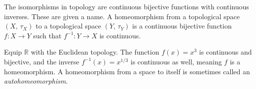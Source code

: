 \documentclass{article}
\theoremstyle{plain}
\theoremstyle{normal}
\newenvironment{example}{%
    \pushQED{\qed}\renewcommand{\qedsymbol}{$\blacksquare$}\examplex%
}{%
    \popQED\endexamplex%
}
\newenvironment{definition}{%
    \pushQED{\qed}\renewcommand{\qedsymbol}{$\blacksquare$}\definitionx%
}{%
    \popQED\enddefinitionx%
}
\begin{document}
            The isomorphisms in topology%
            are continuous bijective functions
            with continuous inverses. These are given a name.
            \begin{definition}[Homeomorphism]
                A homeomorphism from a topological space $(X,\,\tau_{X})$ to a
                topological space $(Y,\,\tau_{Y})$ is a continuous bijective
                function $f:X\rightarrow{Y}$ such that
                $f^{-1}:Y\rightarrow{X}$ is continuous.%
            \end{definition}
            \begin{example}
                Equip $\mathbb{R}$ with the Euclidean topology. The function
                $f(x)=x^{3}$ is continuous and bijective, and the inverse
                $f^{-1}(x)=x^{1/3}$ is continuous as well, meaning $f$ is a
                homeomorphism. A homeomorphism from a space to itself is
                sometimes called an \textit{autohomeomorphism}.%
            \end{example}
\end{document}
